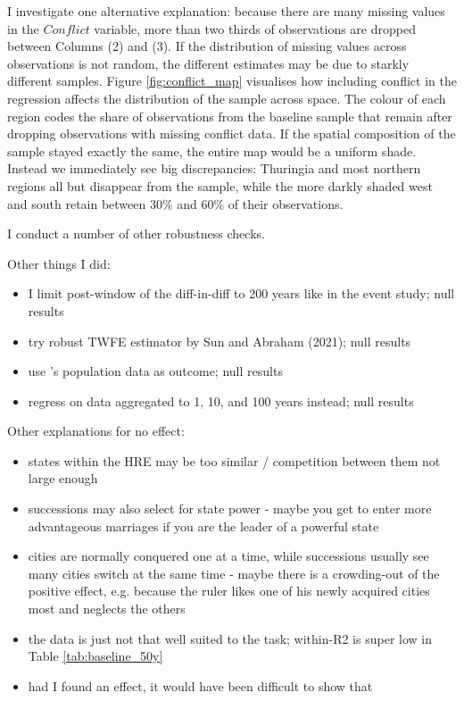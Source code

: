 \documentclass[11pt, a4paper]{article}
\begin{document}
I investigate one alternative explanation: because there are many missing values in the $Conflict$ variable, more than two thirds of observations are dropped between Columns (2) and (3). If the distribution of missing values across observations is not random, the different estimates may be due to starkly different samples. Figure \ref{fig:conflict_map} visualises how including conflict in the regression affects the distribution of the sample across space. The colour of each region codes the share of observations from the baseline sample that remain after dropping observations with missing conflict data. If the spatial composition of the sample stayed exactly the same, the entire map would be a uniform shade. Instead we immediately see big discrepancies: Thuringia and most northern regions all but disappear from the sample, while the more darkly shaded west and south retain between 30\% and 60\% of their observations.

I conduct a number of other robustness checks.

Other things I did:
\begin{itemize}
    \item I limit post-window of the diff-in-diff to 200 years like in the event study; null results
    \item try robust TWFE estimator by Sun and Abraham (2021); null results
    \item use \cite{bairoch1988}'s population data as outcome; null results
    \item regress on data aggregated to 1, 10, and 100 years instead; null results
\end{itemize}


Other explanations for no effect:
\begin{itemize}
    \item states within the HRE may be too similar / competition between them not large enough
    \item successions may also select for state power - maybe you get to enter more advantageous marriages if you are the leader of a powerful state
    \item cities are normally conquered one at a time, while successions usually see many cities switch at the same time - maybe there is a crowding-out of the positive effect, e.g. because the ruler likes one of his newly acquired cities most and neglects the others
    \item the data is just not that well suited to the task; within-R2 is super low in Table \ref{tab:baseline_50y}
    \item had I found an effect, it would have been difficult to show that 

\end{itemize}
\end{document}
